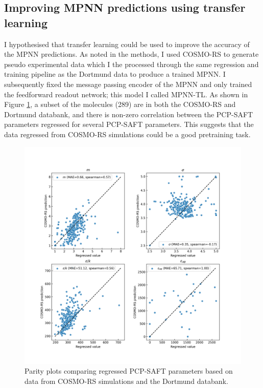 \subsection{Improving MPNN predictions using transfer learning}

I hypothesised that transfer learning could be used to improve the accuracy of the MPNN predictions. As noted in the methods, I used COSMO-RS \cite{Klamt1995, Klamt2010} to generate pseudo experimental data which I the processed through the same regression and training pipeline as the Dortmund data to produce a trained MPNN. I subsequently fixed the message passing encoder of the MPNN and only trained the feedforward readout network; this model I called MPNN-TL. As shown in Figure \ref{fig:cosmo_dortmund}, a subset of the molecules (289) are in both the COSMO-RS and Dortmund databank\footnotemark, and there is non-zero correlation between the PCP-SAFT parameters regressed for several PCP-SAFT parameters. This suggests that the data regressed from COSMO-RS simulations could be a good pretraining task. 

\begin{figure}
    \centering
    \includegraphics[width=\textwidth]{gfx/Chapter08/cosmo_dortmund_parameter_correlations.png}
    \caption{Parity plots comparing regressed PCP-SAFT parameters based on data from COSMO-RS simulations and the Dortmund databank.}
    \label{fig:cosmo_dortmund}
\end{figure}

